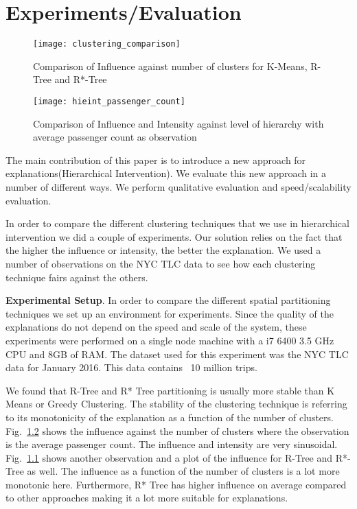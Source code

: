 \chapter{Experiments/Evaluation}
\label{chp:eval}
\label{sec:evaluation}

\begin{figure}[h]
\texttt{[image: clustering\_comparison]}
\caption{Comparison of Influence against number of clusters for K-Means, R-Tree and R*-Tree}
\label{fig:clustering_comparison}
\end{figure}

\begin{figure}[h]
\texttt{[image: hieint\_passenger\_count]}
\caption{Comparison of Influence and Intensity against level of hierarchy with average passenger count as observation}
\label{fig:hieint_passenger_count}
\end{figure}

The main contribution of this paper is to introduce a new approach for explanations(Hierarchical Intervention). We evaluate this new approach in a number of different ways. We perform qualitative evaluation and speed/scalability evaluation. 

In order to compare the different clustering techniques that we use in hierarchical intervention we did a couple of experiments. Our solution relies on the fact that the higher the influence or intensity, the better the explanation. We used a number of observations on the NYC TLC data to see how each clustering technique fairs against the others. 

\textbf{Experimental Setup}. In order to compare the different spatial partitioning techniques we set up an environment for experiments. Since the quality of the explanations do not depend on the speed and scale of the system, these experiments were performed on a single node machine with a i7 6400 3.5 GHz CPU and 8GB of RAM. The dataset used for this experiment was the NYC TLC data for January 2016. This data contains ~10 million trips.

We found that R-Tree and R* Tree partitioning is usually more stable than K Means or Greedy Clustering. The stability of the clustering technique is referring to its monotonicity of the explanation as a function of the number of clusters. Fig.~\ref{fig:hieint_passenger_count} shows the influence against the number of clusters where the observation is the average passenger count. The influence and intensity are very sinusoidal. Fig.~\ref{fig:clustering_comparison} shows another observation and a plot of the influence for R-Tree and R*-Tree as well. The influence as a function of the number of clusters is a lot more monotonic here. Furthermore, R* Tree has higher influence on average compared to other approaches making it a lot more suitable for explanations.


